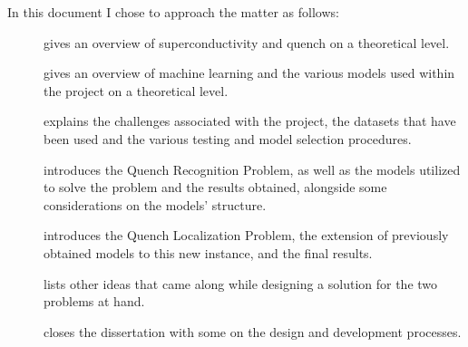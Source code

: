\smallskip

In this document I chose to approach the matter as follows:
\begin{description}
	\item[] gives an overview of superconductivity and quench on a
		theoretical level.
	\item[] gives an overview of machine learning and the various models used
		within the project on a theoretical level.
	\item[] explains the challenges associated with the project, the datasets
		that have been used and the various testing and model selection procedures.
	\item[] introduces the Quench Recognition Problem, as well as the models
		utilized to solve the problem and the results obtained, alongside some
		considerations on the models' structure.
	\item[] introduces the Quench Localization Problem, the extension of previously
		obtained models to this new instance, and the final results.
	\item[] lists other ideas that came along while designing a solution for
		the two problems at hand.
	\item[] closes the dissertation with some on the design and development
		processes.
\end{description}
